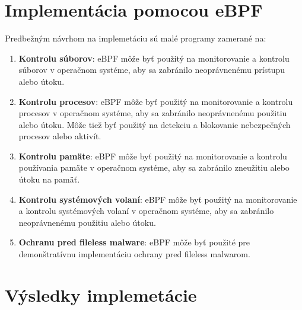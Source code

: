 \section{Implementácia pomocou eBPF}
Predbežným návrhom na implemetáciu sú malé programy zamerané na:
\begin{enumerate}
    \item \textbf{Kontrolu súborov}: eBPF môže byť použitý na monitorovanie a kontrolu súborov v operačnom systéme, aby sa zabránilo 
    neoprávnenému prístupu alebo útoku.
    \item \textbf{Kontrolu procesov}: eBPF môže byť použitý na monitorovanie a kontrolu procesov v operačnom systéme, aby sa zabránilo 
    neoprávnenému použitiu alebo útoku. Môže tiež byť použitý na detekciu a blokovanie nebezpečných procesov alebo aktivít.
    \item \textbf{Kontrolu pamäte}: eBPF môže byť použitý na monitorovanie a kontrolu používania pamäte v operačnom systéme, aby sa zabránilo zneužitiu 
    alebo útoku na pamäť.
    \item \textbf{Kontrolu systémových volaní}: eBPF môže byť použitý na monitorovanie a kontrolu systémových volaní v operačnom systéme, 
    aby sa zabránilo neoprávnenému použitiu alebo útoku.
    \item \textbf{Ochranu pred fileless malware}: eBPF môže byť použité pre demonštratívnu implementáciu ochrany pred fileless malwarom.
\end{enumerate}

\section{Výsledky implemetácie}











